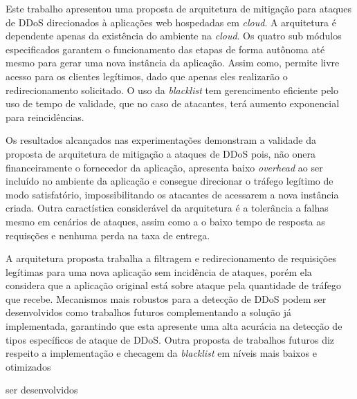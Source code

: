 
Este trabalho apresentou uma proposta de arquitetura de mitigação para ataques de DDoS direcionados à aplicações web hospedadas em \emph{cloud}. A arquitetura é dependente apenas da existência do ambiente na \emph{cloud}. Os quatro sub módulos especificados garantem o funcionamento das etapas de forma autônoma até mesmo para gerar uma nova instância da aplicação. Assim como, permite livre acesso para os clientes legítimos, dado que apenas eles realizarão o redirecionamento solicitado. O uso da \emph{blacklist} tem gerencimento eficiente pelo uso de tempo de validade, que no caso de atacantes, terá aumento exponencial para reincidências.

Os resultados alcançados nas experimentações demonstram a validade da proposta de arquitetura de mitigação a ataques de DDoS pois, não onera financeiramente o fornecedor da aplicação, apresenta baixo \emph{overhead} ao ser incluído no ambiente da aplicação e consegue direcionar o tráfego legítimo de modo satisfatório, impossibilitando os atacantes de acessarem a nova instância criada.
Outra caractística considerável da arquitetura é a tolerância a falhas mesmo em cenários de ataques, assim como a o baixo tempo de resposta as requisções e nenhuma perda na taxa de entrega.   

A arquitetura proposta trabalha a filtragem e redirecionamento de requisições legítimas para uma nova aplicação sem incidência de ataques, porém ela considera que a aplicação original está sobre ataque pela quantidade de tráfego que recebe. Mecanismos mais robustos para a detecção de DDoS podem ser desenvolvidos como trabalhos futuros complementando a solução já implementada, garantindo que esta apresente uma alta acurácia na detecção de tipos específicos de ataque de DDoS. Outra proposta de trabalhos futuros diz respeito a implementação e checagem da \emph{blacklist} em níveis mais baixos e otimizados


 ser desenvolvidos 